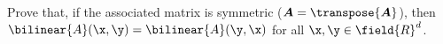 \begin{problem}\label{problem:BilinearForm}
Prove that, if the associated matrix is symmetric ($\boldsymbol{A} = \transpose{\boldsymbol{A}}$), then $\bilinear{A}(\x,\y) = \bilinear{A}(\y,\x)$ for all $\x, \y \in \field{R}^d$.
\end{problem}



